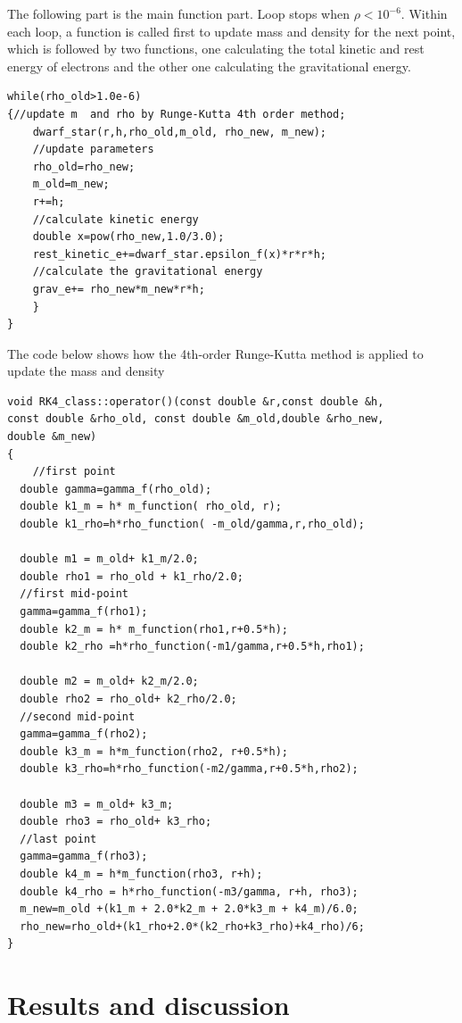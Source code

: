 \documentclass{article}
\begin{document}
The following part is the main function part. Loop stops when $\rho<10^{-6}$. Within each loop, a function is called first to update mass and density for the next point, which is followed by two functions, one calculating the total kinetic and rest energy of electrons and the other one calculating the gravitational energy.
\begin{lstlisting}[frame=single]
while(rho_old>1.0e-6)
{//update m  and rho by Runge-Kutta 4th order method;
	dwarf_star(r,h,rho_old,m_old, rho_new, m_new);
	//update parameters	
	rho_old=rho_new;
	m_old=m_new;
	r+=h;
	//calculate kinetic energy
	double x=pow(rho_new,1.0/3.0);
	rest_kinetic_e+=dwarf_star.epsilon_f(x)*r*r*h;
	//calculate the gravitational energy
	grav_e+= rho_new*m_new*r*h;
	}
}
\end{lstlisting}

The code below shows how the 4th-order Runge-Kutta method is applied to update the mass and density
\begin{lstlisting}[frame=single]
void RK4_class::operator()(const double &r,const double &h, 
const double &rho_old, const double &m_old,double &rho_new,
double &m_new)
{
	//first point
  double gamma=gamma_f(rho_old);
  double k1_m = h* m_function( rho_old, r);
  double k1_rho=h*rho_function( -m_old/gamma,r,rho_old);

  double m1 = m_old+ k1_m/2.0;
  double rho1 = rho_old + k1_rho/2.0;
  //first mid-point
  gamma=gamma_f(rho1);
  double k2_m = h* m_function(rho1,r+0.5*h);
  double k2_rho =h*rho_function(-m1/gamma,r+0.5*h,rho1);

  double m2 = m_old+ k2_m/2.0;
  double rho2 = rho_old+ k2_rho/2.0;
  //second mid-point
  gamma=gamma_f(rho2);
  double k3_m = h*m_function(rho2, r+0.5*h);
  double k3_rho=h*rho_function(-m2/gamma,r+0.5*h,rho2);

  double m3 = m_old+ k3_m;
  double rho3 = rho_old+ k3_rho;
  //last point
  gamma=gamma_f(rho3);
  double k4_m = h*m_function(rho3, r+h);
  double k4_rho = h*rho_function(-m3/gamma, r+h, rho3);
  m_new=m_old +(k1_m + 2.0*k2_m + 2.0*k3_m + k4_m)/6.0;
  rho_new=rho_old+(k1_rho+2.0*(k2_rho+k3_rho)+k4_rho)/6;
}
\end{lstlisting}

\section{Results and discussion}
\end{document}
